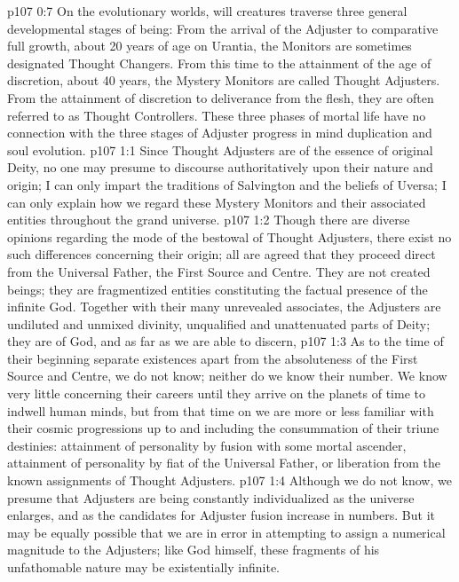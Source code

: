 \vs p107 0:7 \pc On the evolutionary worlds, will creatures traverse three general developmental stages of being: From the arrival of the Adjuster to comparative full growth, about 20 years of age on Urantia, the Monitors are sometimes designated Thought Changers. From this time to the attainment of the age of discretion, about 40 years, the Mystery Monitors are called Thought Adjusters. From the attainment of discretion to deliverance from the flesh, they are often referred to as Thought Controllers. These three phases of mortal life have no connection with the three stages of Adjuster progress in mind duplication and soul evolution.
\vs p107 1:1 Since Thought Adjusters are of the essence of original Deity, no one may presume to discourse authoritatively upon their nature and origin; I can only impart the traditions of Salvington and the beliefs of Uversa; I can only explain how we regard these Mystery Monitors and their associated entities throughout the grand universe.
\vs p107 1:2 Though there are diverse opinions regarding the mode of the bestowal of Thought Adjusters, there exist no such differences concerning their origin; all are agreed that they proceed direct from the Universal Father, the First Source and Centre. They are not created beings; they are fragmentized entities constituting the factual presence of the infinite God. Together with their many unrevealed associates, the Adjusters are undiluted and unmixed divinity, unqualified and unattenuated parts of Deity; they are of God, and as far as we are able to discern, 
\vs p107 1:3 As to the time of their beginning separate existences apart from the absoluteness of the First Source and Centre, we do not know; neither do we know their number. We know very little concerning their careers until they arrive on the planets of time to indwell human minds, but from that time on we are more or less familiar with their cosmic progressions up to and including the consummation of their triune destinies: attainment of personality by fusion with some mortal ascender, attainment of personality by fiat of the Universal Father, or liberation from the known assignments of Thought Adjusters.
\vs p107 1:4 Although we do not know, we presume that Adjusters are being constantly individualized as the universe enlarges, and as the candidates for Adjuster fusion increase in numbers. But it may be equally possible that we are in error in attempting to assign a numerical magnitude to the Adjusters; like God himself, these fragments of his unfathomable nature may be existentially infinite.
